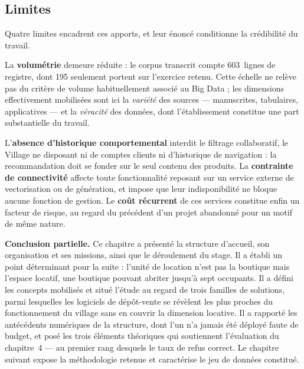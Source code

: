 \subsection{Limites}

Quatre limites encadrent ces apports, et leur énoncé conditionne la crédibilité du travail.

La \textbf{volumétrie} demeure réduite : le corpus transcrit compte 603~lignes de registre, dont 195 seulement portent sur l'exercice retenu. Cette échelle ne relève pas du critère de volume habituellement associé au Big Data ; les dimensions effectivement mobilisées sont ici la \emph{variété} des sources --- manuscrites, tabulaires, applicatives --- et la \emph{véracité} des données, dont l'établissement constitue une part substantielle du travail.

L'\textbf{absence d'historique comportemental} interdit le filtrage collaboratif, le Village ne disposant ni de comptes clients ni d'historique de navigation : la recommandation doit se fonder sur le seul contenu des produits. La \textbf{contrainte de connectivité} affecte toute fonctionnalité reposant sur un service externe de vectorisation ou de génération, et impose que leur indisponibilité ne bloque aucune fonction de gestion. Le \textbf{coût récurrent} de ces services constitue enfin un facteur de risque, au regard du précédent d'un projet abandonné pour un motif de même nature.

\vspace{1em}
\noindent\textbf{Conclusion partielle.} Ce chapitre a présenté la structure d'accueil, son organisation et ses missions, ainsi que le déroulement du stage. Il a établi un point déterminant pour la suite : l'unité de location n'est pas la boutique mais l'espace locatif, une boutique pouvant abriter jusqu'à sept occupants. Il a défini les concepts mobilisés et situé l'étude au regard de trois familles de solutions, parmi lesquelles les logiciels de dépôt-vente se révèlent les plus proches du fonctionnement du village sans en couvrir la dimension locative. Il a rapporté les antécédents numériques de la structure, dont l'un n'a jamais été déployé faute de budget, et posé les trois éléments théoriques qui soutiennent l'évaluation du chapitre~4 --- au premier rang desquels le taux de refus correct. Le chapitre suivant expose la méthodologie retenue et caractérise le jeu de données constitué.
